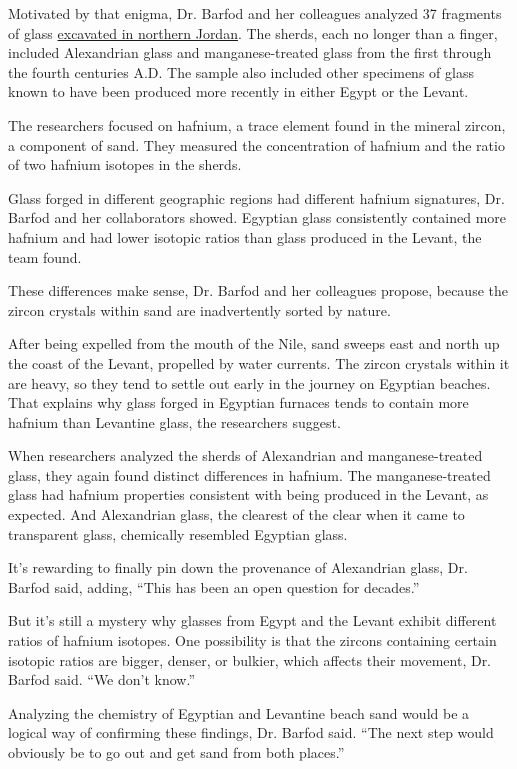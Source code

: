 Motivated by that enigma, Dr. Barfod and her colleagues analyzed 37
fragments of glass
\href{https://projects.au.dk/internationaljerashexcavation/}{excavated
in northern Jordan}. The sherds, each no longer than a finger, included
Alexandrian glass and manganese-treated glass from the first through the
fourth centuries A.D. The sample also included other specimens of glass
known to have been produced more recently in either Egypt or the Levant.

The researchers focused on hafnium, a trace element found in the mineral
zircon, a component of sand. They measured the concentration of hafnium
and the ratio of two hafnium isotopes in the sherds.

Glass forged in different geographic regions had different hafnium
signatures, Dr. Barfod and her collaborators showed. Egyptian glass
consistently contained more hafnium and had lower isotopic ratios than
glass produced in the Levant, the team found.

These differences make sense, Dr. Barfod and her colleagues propose,
because the zircon crystals within sand are inadvertently sorted by
nature.

After being expelled from the mouth of the Nile, sand sweeps east and
north up the coast of the Levant, propelled by water currents. The
zircon crystals within it are heavy, so they tend to settle out early in
the journey on Egyptian beaches. That explains why glass forged in
Egyptian furnaces tends to contain more hafnium than Levantine glass,
the researchers suggest.

When researchers analyzed the sherds of Alexandrian and
manganese-treated glass, they again found distinct differences in
hafnium. The manganese-treated glass had hafnium properties consistent
with being produced in the Levant, as expected. And Alexandrian glass,
the clearest of the clear when it came to transparent glass, chemically
resembled Egyptian glass.

It's rewarding to finally pin down the provenance of Alexandrian glass,
Dr. Barfod said, adding, ``This has been an open question for decades.''

But it's still a mystery why glasses from Egypt and the Levant exhibit
different ratios of hafnium isotopes. One possibility is that the
zircons containing certain isotopic ratios are bigger, denser, or
bulkier, which affects their movement, Dr. Barfod said. ``We don't
know.''

Analyzing the chemistry of Egyptian and Levantine beach sand would be a
logical way of confirming these findings, Dr. Barfod said. ``The next
step would obviously be to go out and get sand from both places.''

